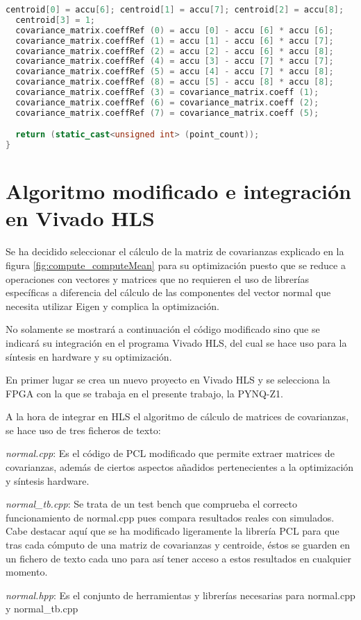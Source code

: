  \begin{lstlisting}[language=C++,breaklines]
  centroid[0] = accu[6]; centroid[1] = accu[7]; centroid[2] = accu[8];
  centroid[3] = 1;
  covariance_matrix.coeffRef (0) = accu [0] - accu [6] * accu [6];
  covariance_matrix.coeffRef (1) = accu [1] - accu [6] * accu [7];
  covariance_matrix.coeffRef (2) = accu [2] - accu [6] * accu [8];
  covariance_matrix.coeffRef (4) = accu [3] - accu [7] * accu [7];
  covariance_matrix.coeffRef (5) = accu [4] - accu [7] * accu [8];
  covariance_matrix.coeffRef (8) = accu [5] - accu [8] * accu [8];
  covariance_matrix.coeffRef (3) = covariance_matrix.coeff (1);
  covariance_matrix.coeffRef (6) = covariance_matrix.coeff (2);
  covariance_matrix.coeffRef (7) = covariance_matrix.coeff (5);

  return (static_cast<unsigned int> (point_count));
}
\end{lstlisting}



\section{Algoritmo modificado e integración en Vivado HLS}
Se ha decidido seleccionar el cálculo de la matriz de covarianzas explicado en la figura \ref{fig:compute_computeMean} para su optimización puesto que se reduce a operaciones con vectores y matrices que no requieren el uso de librerías específicas a diferencia del cálculo de las componentes del vector normal que necesita utilizar Eigen y complica la optimización.

No solamente se mostrará a continuación el código modificado sino que se indicará su integración en el programa Vivado HLS, del cual se hace uso para la síntesis en hardware y su optimización.

En primer lugar se crea un nuevo proyecto en Vivado HLS y se selecciona la FPGA con la que se trabaja en el presente trabajo, la PYNQ-Z1.

A la hora de integrar en HLS el algoritmo de cálculo de matrices de covarianzas, se hace uso de tres ficheros de texto:

\begin{list}{•}
\item \textit{normal.cpp}: Es el código de PCL modificado que permite extraer matrices de covarianzas, además de ciertos aspectos añadidos pertenecientes a la optimización y síntesis hardware.
\item \textit{normal\_tb.cpp}: Se trata de un test bench que comprueba el correcto funcionamiento de normal.cpp pues compara resultados reales con simulados. Cabe destacar aquí que se ha modificado ligeramente la librería PCL para que tras cada cómputo de una matriz de covarianzas y centroide, éstos se guarden en un fichero de texto cada uno para así tener acceso a estos resultados en cualquier momento.
\item \textit{normal.hpp}: Es el conjunto de herramientas y librerías necesarias para normal.cpp y normal\_tb.cpp
\end{list}

